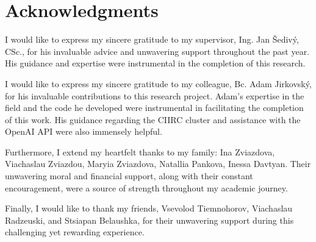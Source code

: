 
\section*{Acknowledgments}

I would like to express my sincere gratitude to my supervisor, Ing. Jan Šedivý, CSc., for his invaluable advice and unwavering support throughout the past year.
His guidance and expertise were instrumental in the completion of this research.

I would like to express my sincere gratitude to my colleague, Bc. Adam Jirkovský, for his invaluable contributions to this research project.
Adam's expertise in the field and the code he developed were instrumental in facilitating the completion of this work.
His guidance regarding the CIIRC cluster and assistance with the OpenAI API were also immensely helpful.

Furthermore, I extend my heartfelt thanks to my family: Ina Zviazdova, Viachaslau Zviazdou, Maryia Zviazdova, Natallia Pankova, Inessa Davtyan.
Their unwavering moral and financial support, along with their constant encouragement, were a source of strength throughout my academic journey.

Finally, I would like to thank my friends, Vsevolod Tiemnohorov, Viachaslau Radzeuski, and Stsiapan Belaushka, for their unwavering support during this challenging yet rewarding experience.

\vspace{2.5cm}
